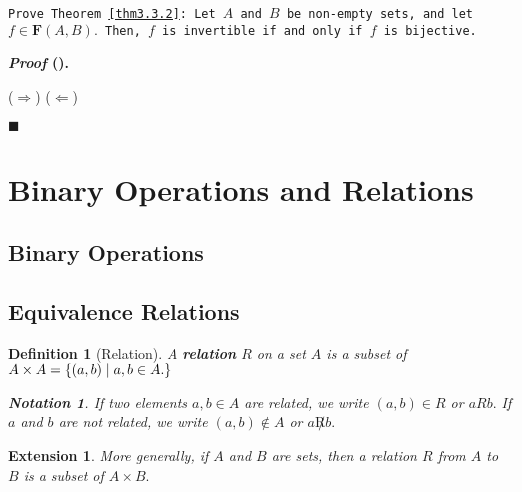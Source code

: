 \documentclass[12pt,a4paper]{article}
\newtheorem{nota}{Notation}[section]
\newtheorem{df}{Definition}[subsection]
\newcounter{nprf}[subsection]
\newenvironment*{prf}{\par\indent\textbf{\textit{Proof} (\stepcounter{nprf}\thenprf). }\par }{\par\hfill $\blacksquare$\par}
\newtheorem*{ext}{\indent Extension}
\def\F{\mathbf{F}}
\begin{document}
\begin{framed}
\noindent\texttt{Prove Theorem \ref{thm3.3.2}: Let $A$ and $B$ be non-empty sets, and let $f\in\F(A,B).$ Then, $f$ is invertible if and only if $f$ is bijective.}
\begin{prf}
	($\Rightarrow$)
	($\Leftarrow$)
\end{prf}
\end{framed}


\newpage
\section{Binary Operations and Relations}
\subsection{Binary Operations}
\subsection{Equivalence Relations}
\begin{df}[Relation]
	A \textbf{relation} $R$	 on a set $A$ is a subset of $A\times A=\qty{\qty(a,b)\mid a,b\in A.}$ 
\begin{nota}
	If two elements $a,b\in A$ are related, we write $(a,b)\in R$ or $aRb.$ If $a$ and $b$ are not related, we write $(a,b)\notin A$ or $a\not Rb.$
\end{nota}
\end{df}
\begin{ext} More generally, if $A$ and $B$ are sets, then a relation $R$ from $A$ to $B$ is a subset of $A\times B.$\end{ext}
\end{document}
